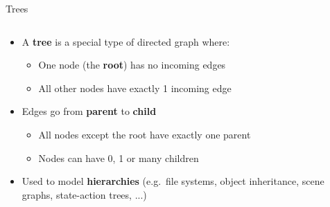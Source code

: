\begin{frame}{Trees}
\begin{columns}
		\begin{column}{0.68\textwidth}
			\begin{itemize}
				\pause\item A \textbf{tree} is a special type of directed graph where:
					\begin{itemize}
						\pause\item One node (the \textbf{root}) has no incoming edges
						\pause\item All other nodes have exactly 1 incoming edge
					\end{itemize}
				\pause\item Edges go from \textbf{parent} to \textbf{child}
					\begin{itemize}
						\pause\item All nodes except the root have exactly one parent
						\pause\item Nodes can have 0, 1 or many children
					\end{itemize}
				\pause\item Used to model \textbf{hierarchies} (e.g.\ file systems, object inheritance, scene graphs, state-action trees, ...)
			\end{itemize}
		\end{column}
	\end{columns}
\end{frame}

